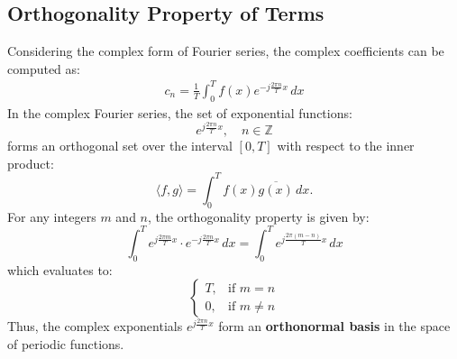 \begin{multicols}{2}
\subsection{Orthogonality Property of Terms}
Considering the complex form of Fourier series, the complex coefficients can be computed as:
\begin{align}
c_n = \frac{1}{T} \int_{0}^{T} f(x) e^{-j \frac{2\pi n}{T} x} \, dx 
\end{align}
In the complex Fourier series, the set of exponential functions:
\[
e^{j \frac{2\pi n}{T} x}, \quad n \in \mathbb{Z}
\]
forms an orthogonal set over the interval \( [0, T] \) with respect to the inner product:
\[
\langle f, g \rangle = \int_{0}^{T} f(x) \overline{g(x)} \, dx.
\]
For any integers \( m \) and \( n \), the orthogonality property is given by:
\[
\int_{0}^{T} e^{j \frac{2\pi m}{T} x} \cdot e^{-j \frac{2\pi n}{T} x} \, dx
= \int_{0}^{T} e^{j \frac{2\pi (m-n)}{T} x} \, dx
\]
which evaluates to:
\[
\begin{cases}
T, & \text{if } m = n \\
0, & \text{if } m \neq n
\end{cases}
\]
Thus, the complex exponentials \( e^{j \frac{2\pi n}{T} x} \) form an \textbf{orthonormal basis} in the space of periodic functions.


\end{multicols}
